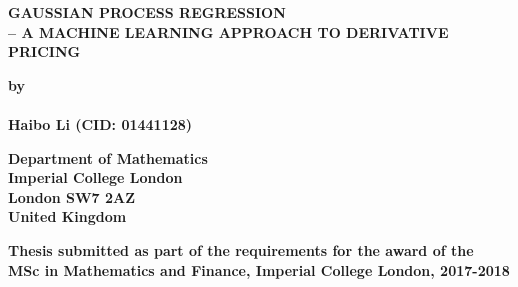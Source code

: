 \thispagestyle{empty}
\null\vskip0.2in%
\begin{center}
\LARGE{{\bf 
GAUSSIAN PROCESS REGRESSION \\-- A MACHINE LEARNING APPROACH TO DERIVATIVE PRICING}}
\end{center}

\vspace{0.5cm}

\begin{center}
{\Large {\bf by}}\\
\mbox{} \\
{\Large {\bf Haibo Li (CID: 01441128)}}
\end{center}

\vspace{1.5cm}

\begin{center}
\large{\bf{Department of Mathematics \\ Imperial College London \\
London SW7 2AZ \\ United Kingdom}}
\end{center}



\vspace{5.5cm}

\begin{center}
\large{\bf{Thesis submitted as part of the requirements for the award of the \\
MSc in Mathematics and Finance, Imperial College London, 2017-2018}}
\end{center}

\vspace{2cm}

